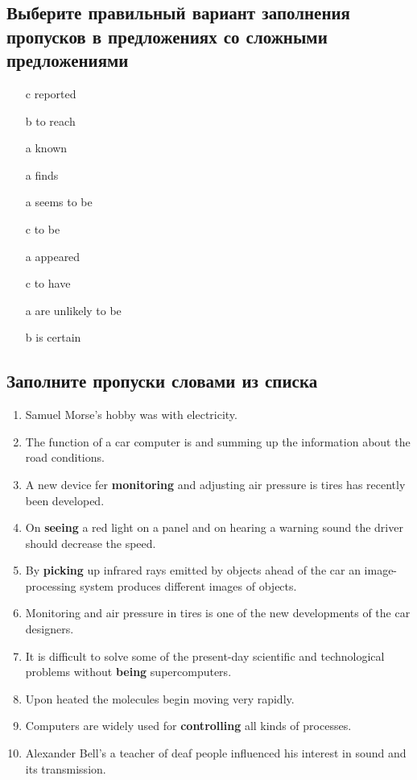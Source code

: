 \subsection{Выберите правильный вариант заполнения пропусков в предложениях со сложными предложениями}
\begin{enumerate}
    \item[c] reported
    \item[b] to reach
    \item[a] known
    \item[a] finds
    \item[a] seems to be
    \item[c] to be
    \item[a] appeared
    \item[c] to have
    \item[a] are unlikely to be
    \item[b] is certain
\end{enumerate}

\subsection{Заполните пропуски словами из списка}
\begin{enumerate}
    \item Samuel Morse's hobby was \textbf{} with electricity.
    \item The function of a car computer is \textbf{} and summing up the information about the road conditions.
    \item A new device fer \textbf{monitoring} and adjusting air pressure is tires has recently been developed.
    \item On \textbf{seeing} a red light on a panel and on hearing a warning sound the driver should decrease the speed.
    \item By \textbf{picking} up infrared rays emitted by objects ahead of the car an image-processing system produces different images of objects.
    \item Monitoring and \textbf{} air pressure in tires is one of the new developments of the car designers.
    \item It is difficult to solve some of the present-day scientific and technological problems without \textbf{being} supercomputers.
    \item Upon \textbf{} heated the molecules begin moving very rapidly.
    \item Computers are widely used for \textbf{controlling} all kinds of processes.
    \item Alexander Bell's \textbf{} a teacher of deaf people influenced his interest in sound and its transmission.
\end{enumerate}


